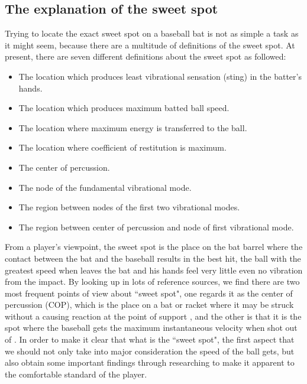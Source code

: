 \subsection{The explanation of the sweet spot}

Trying to locate the exact sweet spot on a baseball bat is not as simple a task as it might seem, because there are a multitude of definitions of the sweet spot. At present, there are seven different definitions about the sweet spot as followed:\cite{hollowsoftball}

\begin{itemize}
\item The location which produces least vibrational sensation (sting) in the batter's hands.

\item The location which produces maximum batted ball speed.

\item The location where maximum energy is transferred to the ball.

\item The location where coefficient of restitution is maximum.

\item The center of percussion.

\item The node of the fundamental vibrational mode.

\item The region between nodes of the first two vibrational modes.

\item The region between center of percussion and node of first vibrational mode.

\end{itemize}


From a player's viewpoint, the sweet spot is the place on the bat barrel where the contact between the bat and the baseball results in the best hit, the ball with the greatest speed when leaves the bat and his hands feel very little even no vibration from the impact. By looking up in lots of reference sources, we find there are two most frequent points of view about ``sweet spot", one regards it as the center of percussion (COP), which is the place on a bat or racket where it may be struck without a causing reaction at the point of support \cite{Percussion}, and the other is that it is the spot where the baseball gets the maximum instantaneous velocity when shot out of \cite{hollowsoftball}. In order to make it clear that what is the ``sweet spot", the first aspect that we should not only take into major consideration the speed of the ball gets, but also obtain some important findings through researching to make it apparent to the comfortable standard of the player.


